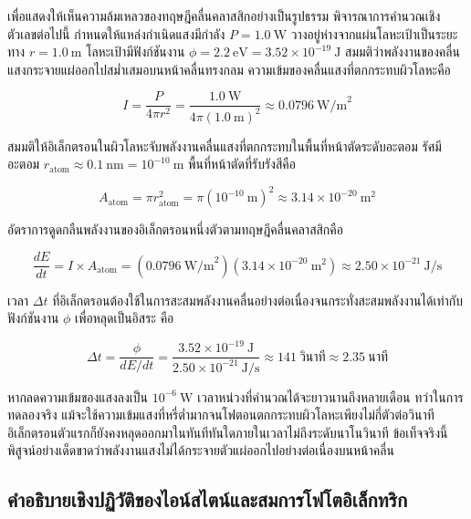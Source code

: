 เพื่อแสดงให้เห็นความล้มเหลวของทฤษฎีคลื่นคลาสสิกอย่างเป็นรูปธรรม พิจารณาการคำนวณเชิงตัวเลขต่อไปนี้ กำหนดให้แหล่งกำเนิดแสงมีกำลัง $P = 1.0~\text{W}$ วางอยู่ห่างจากแผ่นโลหะเป้าเป็นระยะทาง $r = 1.0~\text{m}$ โลหะเป้ามีฟังก์ชันงาน $\phi = 2.2~\text{eV} = 3.52 \times 10^{-19}~\text{J}$ สมมติว่าพลังงานของคลื่นแสงกระจายแผ่ออกไปสม่ำเสมอบนหน้าคลื่นทรงกลม ความเข้มของคลื่นแสงที่ตกกระทบผิวโลหะคือ

\begin{equation}
I = \frac{P}{4\pi r^2} = \frac{1.0~\text{W}}{4\pi(1.0~\text{m})^2} \approx 0.0796~\text{W/m}^2
\end{equation}

สมมติให้อิเล็กตรอนในผิวโลหะจับพลังงานคลื่นแสงที่ตกกระทบในพื้นที่หน้าตัดระดับอะตอม รัศมีอะตอม $r_{\text{atom}} \approx 0.1~\text{nm} = 10^{-10}~\text{m}$ พื้นที่หน้าตัดที่รับรังสีคือ

\begin{equation}
A_{\text{atom}} = \pi r_{\text{atom}}^2 = \pi(10^{-10}~\text{m})^2 \approx 3.14 \times 10^{-20}~\text{m}^2
\end{equation}

อัตราการดูดกลืนพลังงานของอิเล็กตรอนหนึ่งตัวตามทฤษฎีคลื่นคลาสสิกคือ

\begin{equation}
\frac{dE}{dt} = I \times A_{\text{atom}} = (0.0796~\text{W/m}^2)(3.14 \times 10^{-20}~\text{m}^2) \approx 2.50 \times 10^{-21}~\text{J/s}
\end{equation}

เวลา $\Delta t$ ที่อิเล็กตรอนต้องใช้ในการสะสมพลังงานคลื่นอย่างต่อเนื่องจนกระทั่งสะสมพลังงานได้เท่ากับฟังก์ชันงาน $\phi$ เพื่อหลุดเป็นอิสระ คือ

\begin{equation}
\Delta t = \frac{\phi}{dE/dt} = \frac{3.52 \times 10^{-19}~\text{J}}{2.50 \times 10^{-21}~\text{J/s}} \approx 141~\text{วินาที} \approx 2.35~\text{นาที}
\end{equation}

หากลดความเข้มของแสงลงเป็น $10^{-6}~\text{W}$ เวลาหน่วงที่คำนวณได้จะยาวนานถึงหลายเดือน ทว่าในการทดลองจริง แม้จะใช้ความเข้มแสงที่หรี่ต่ำมากจนโฟตอนตกกระทบผิวโลหะเพียงไม่กี่ตัวต่อวินาที อิเล็กตรอนตัวแรกก็ยังคงหลุดออกมาในทันทีทันใดภายในเวลาไม่ถึงระดับนาโนวินาที ข้อเท็จจริงนี้พิสูจน์อย่างเด็ดขาดว่าพลังงานแสงไม่ได้กระจายตัวแผ่ออกไปอย่างต่อเนื่องบนหน้าคลื่น

\subsection{คำอธิบายเชิงปฏิวัติของไอน์สไตน์และสมการโฟโตอิเล็กทริก}

